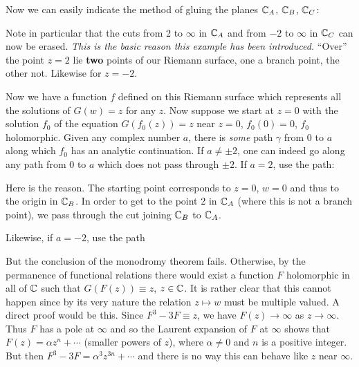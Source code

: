 \documentclass[a4paper,11pt]{article}
\begin{document}
\begin{mdframed}
  \vspace{3cm}
\end{mdframed}

Now we can easily indicate the method of gluing the planes ${\mathbb C}_A$,
${\mathbb C}_B$, ${\mathbb C}_C$:

\begin{mdframed}
  \vspace{3cm}
\end{mdframed}

Note in particular that the cuts from 2 to $\infty$ in ${\mathbb C}_A$ and
from $-2$ to $\infty$ in ${\mathbb C}_C$ can now be erased.  \emph{This is
  the basic reason this example has been introduced.} ``Over''
the point $z = 2$ lie \textbf{two} points of our Riemann surface, one
a branch point, the other not.  Likewise for $z = -2$.

Now we have a function $f$ defined on this Riemann surface which
represents all the solutions of $G(w) = z$ for any $z$.  Now suppose
we start at $z = 0$ with the solution $f_0$ of the equation $G(f_0(z))
= z$ near $z = 0$, $f_0(0) = 0$, $f_0$ holomorphic.  Given any complex
number $a$, there is \emph{some} path $\gamma$ from 0 to $a$ along
which $f_0$ has an analytic continuation.  If $a \ne \pm 2$, one can
indeed go along any path from 0 to $a$ which does not pass through
$\pm 2$.  If $a = 2$, use the path:

\begin{mdframed}
  \begin{minipage}{7cm}
  \end{minipage}%
  \begin{minipage}{8cm}
    Here is the reason.  The starting point corresponds to $z= 0$, $w
    =0$ and thus to the origin in ${\mathbb C}_B$.  In order to get to the
    point 2 in ${\mathbb C}_A$ (where this is not a branch point), we pass
    through the cut joining ${\mathbb C}_B$ to ${\mathbb C}_A$. 
  \end{minipage}
\end{mdframed}

Likewise, if $a = -2$, use the path

\begin{mdframed}
  \vspace{3cm}
\end{mdframed}

But the conclusion of the monodromy theorem fails.  Otherwise, by the
permanence of functional relations there would exist a function $F$
holomorphic in all of ${\mathbb C}$ such that $G(F(z)) \equiv z$, $z \in
{\mathbb C}$. It is rather clear that this cannot happen since by its very
nature the relation $z \mapsto w$ must be multiple valued.  A direct
proof would be this.  Since $F^3 - 3F \equiv z$, we have $F(z) \to
\infty$ as $z \to \infty$.  Thus $F$ has a pole at $\infty$ and so the
Laurent expansion of $F$ at $\infty$ shows that $F(z) = \alpha z^n +
\cdots$ (smaller powers of $z$), where $\alpha \ne 0$ and $n$ is a
positive integer.  But then $F^3 - 3F = \alpha^3 z^{3n} + \cdots$ and
there is no way this can behave like $z$ near $\infty$.
\end{document}
